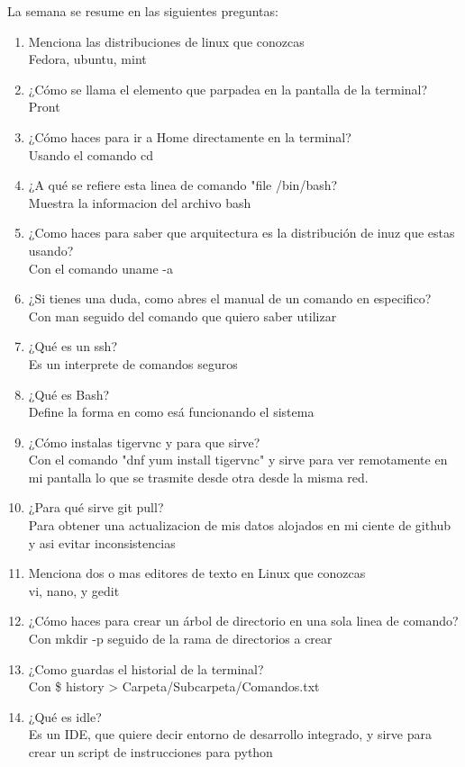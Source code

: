 \documentclass{book}
\begin{document}
La semana se resume en las siguientes preguntas:%
\begin{enumerate}%
	\item Menciona las distribuciones de linux que conozcas \\
	Fedora, ubuntu, mint	
	
	\item ¿Cómo se llama el elemento que parpadea en la pantalla de la terminal?\\
	Pront
	\item ¿Cómo haces para ir a Home directamente en la terminal?\\
	Usando el comando cd
	\item ¿A qué se refiere esta linea de comando "file /bin/bash?\\
	Muestra la informacion del archivo bash
	\item ¿Como haces para saber que arquitectura es la distribución de inuz que estas usando?\\
	Con el comando uname -a
	\item ¿Si tienes una duda, como abres el manual de un comando en especifico?\\
	Con man seguido del comando que quiero saber utilizar
	\item ¿Qué es un ssh?\\
	Es un interprete de comandos seguros
	\item ¿Qué es Bash?\\
	Define la forma en como esá funcionando el sistema
	
	\item ¿Cómo instalas tigervnc y para que sirve?\\
	Con el comando "dnf yum install tigervnc" y sirve para ver remotamente en mi pantalla lo que se trasmite desde otra desde la misma red.
	
	\item ¿Para qué sirve git pull?\\
	Para obtener una actualizacion de mis datos alojados en mi ciente de github y asi evitar inconsistencias
	
	\item Menciona dos o mas editores de texto en Linux que conozcas\\
	vi, nano, y gedit
	\item ¿Cómo haces para crear un árbol de directorio en una sola linea de comando?\\
	Con mkdir -p seguido de la rama de directorios a crear
	\item ¿Como guardas el historial de la terminal?\\
	Con \$ history > Carpeta/Subcarpeta/Comandos.txt
	\item ¿Qué es idle?\\
	Es un IDE, que quiere decir entorno de desarrollo integrado, y sirve para crear un script de instrucciones para python
	

\end{enumerate}
\end{document}
